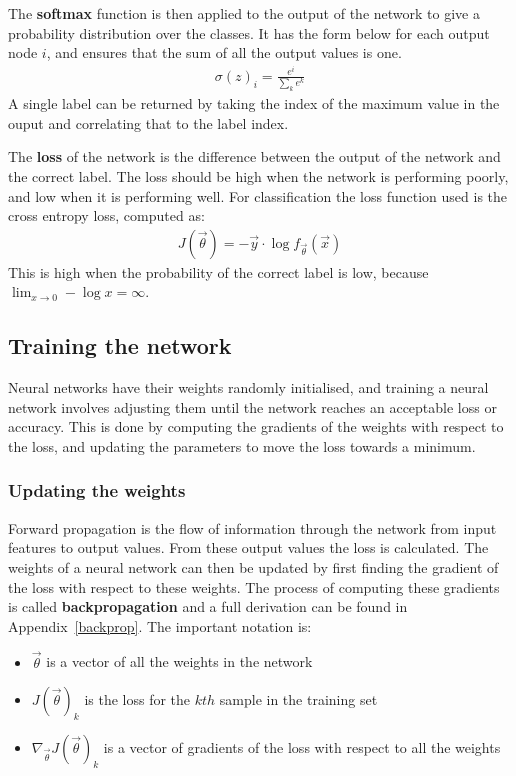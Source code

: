 The \textbf{softmax} function is then applied to the output of the network to give a probability distribution over the classes. It has the 
form below for each output node $i$, and ensures that the sum of all the output values is one.
\begin{align}
  \sigma(z)_{i} = \frac{e^{i}}{\sum_{k} e^{k}}
\end{align}
A single label can be returned by taking the index of the maximum value in the ouput and correlating that to the label index. 

The \textbf{loss} of the network is the difference between the output of the network and the correct label. The loss should be high 
when the network is performing poorly, and low when it is performing well. For classification the loss function used is the cross 
entropy loss, computed as:
\begin{align}
  J(\vec{\theta}) = - \vec{y} \cdot \log{f_{\vec{\theta}}(\vec{x})} \label{eq:ce}
\end{align}
This is high when the probability of the correct label is low, because $\lim_{x \to 0} -\log{x} = \infty$.

\subsection{Training the network} \label{train}

Neural networks have their weights randomly initialised, and training a neural network involves adjusting them 
until the network reaches an acceptable loss or accuracy. This is done by computing 
the gradients of the weights with respect to the loss, and updating the parameters to move the loss towards 
a minimum.

\subsubsection{Updating the weights}

Forward propagation is the flow of information through the network from input features to output values. From these output values the loss is calculated. 
The weights of a neural network can then be updated by first finding the gradient of the loss with respect to these weights.
The process of computing these gradients is called \textbf{backpropagation} and a full derivation can be found in Appendix~\ref{backprop}. The important notation is:

\begin{itemize}
  \item $\vec{\theta}$ is a vector of all the weights in the network
  \item $J(\vec{\theta})_k$ is the loss for the $kth$ sample in the training set
  \item $\nabla_{\vec{\theta}} J(\vec{\theta})_k$ is a vector of gradients of the loss with respect to all the weights 
\end{itemize}


